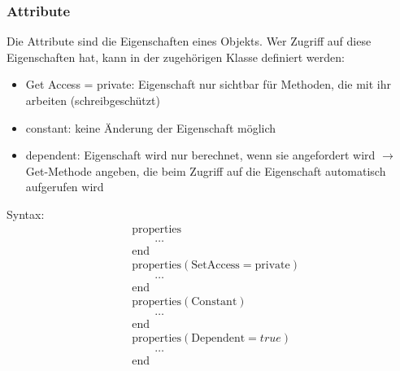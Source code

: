 \documentclass[12pt,bibstyle=none,pagenumberinfooter]{ifmdocument}
\begin{document}
	\subsubsection{Attribute}
	Die Attribute sind die Eigenschaften eines Objekts. Wer Zugriff auf diese Eigenschaften hat, kann in der zugehörigen Klasse definiert werden:
	\begin{itemize}
		\item Get Access = private: Eigenschaft nur sichtbar f\"ur Methoden, die mit ihr arbeiten (schreibgesch\"utzt)
		\item constant: keine \"Anderung der Eigenschaft m\"oglich
		\item dependent: Eigenschaft wird nur berechnet, wenn sie angefordert wird $\rightarrow$ Get-Methode angeben, die beim Zugriff auf die Eigenschaft automatisch aufgerufen wird
	\end{itemize}
Syntax:
	\begin{align*}
		&\text{properties} \\
		& \qquad \ldots \\
		&\text{end} \\
		&\text{properties} (\text{SetAccess}=\text{private}) \\
		& \qquad \ldots \\               
		&\text{end} \\
		&\text{properties} (\text{Constant})\\
		& \qquad\ldots \\
		&\text{end}\\
		&\text{properties} (\text{Dependent} = true)\\
		& \qquad \ldots \\
		&\text{end} 
	\end{align*}
\end{document}
